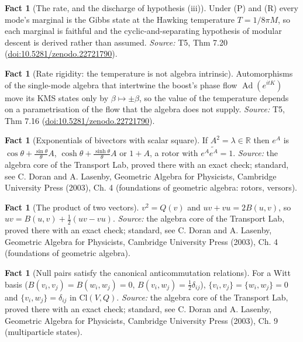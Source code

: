 \documentclass[11pt]{article}
\theoremstyle{definition}
\newtheorem{fact}[theorem]{Fact}
\theoremstyle{plain}
\providecommand{\Cl}{}\renewcommand{\Cl}{\mathrm{Cl}}
\providecommand{\R}{}\renewcommand{\R}{\mathbb{R}}
\begin{document}
\begin{fact}[The rate, and the discharge of hypothesis (iii)]\label{c:singularity.rate-discharge-hypothesis-iii}
Under (P) and (R) every mode's marginal is the Gibbs state at the Hawking temperature $T = 1/8\pi M$, so each marginal is faithful and the cyclic-and-separating hypothesis of modular descent is derived rather than assumed.
\emph{Source:} T5, Thm 7.20 (\href{https://doi.org/10.5281/zenodo.22721790}{doi:10.5281/zenodo.22721790}).
\end{fact}

\begin{fact}[Rate rigidity: the temperature is not algebra intrinsic]\label{c:singularity.rate-rigidity-temperature-not-algebra-intrinsic}
Automorphisms of the single-mode algebra that intertwine the boost's phase flow $\operatorname{Ad}(e^{itK})$ move its KMS states only by $\beta \mapsto \pm\beta$, so the value of the temperature depends on a parametrisation of the flow that the algebra does not supply.
\emph{Source:} T5, Thm 7.16 (\href{https://doi.org/10.5281/zenodo.22721790}{doi:10.5281/zenodo.22721790}).
\end{fact}

\begin{fact}[Exponentials of bivectors with scalar square]\label{c:std-algebra.bivector-exponential}
If $A^{2} = \lambda \in \R$ then $e^{A}$ is $\cos\theta + \frac{\sin\theta}{\theta}A$, $\cosh\theta + \frac{\sinh\theta}{\theta}A$ or $1 + A$, a rotor with $e^{A}\widetilde{e^{A}} = 1$.
\emph{Source:} the algebra core of the Transport Lab, proved there with an exact check; standard, see C. Doran and A. Lasenby, Geometric Algebra for Physicists, Cambridge University Press (2003), Ch. 4 (foundations of geometric algebra: rotors, versors).
\end{fact}

\begin{fact}[The product of two vectors]\label{c:std-algebra.vector-squares}
$v^{2} = Q(v)$ and $uv + vu = 2B(u, v)$, so $uv = B(u, v) + \tfrac12(uv - vu)$.
\emph{Source:} the algebra core of the Transport Lab, proved there with an exact check; standard, see C. Doran and A. Lasenby, Geometric Algebra for Physicists, Cambridge University Press (2003), Ch. 4 (foundations of geometric algebra).
\end{fact}

\begin{fact}[Null pairs satisfy the canonical anticommutation relations]\label{c:std-algebra.witt-basis-car}
For a Witt basis ($B(v_i,v_j) = B(w_i,w_j) = 0$, $B(v_i,w_j) = \tfrac12\delta_{ij}$), $\{v_i,v_j\} = \{w_i,w_j\} = 0$ and $\{v_i,w_j\} = \delta_{ij}$ in $\Cl(V,Q)$.
\emph{Source:} the algebra core of the Transport Lab, proved there with an exact check; standard, see C. Doran and A. Lasenby, Geometric Algebra for Physicists, Cambridge University Press (2003), Ch. 9 (multiparticle states).
\end{fact}
\end{document}
